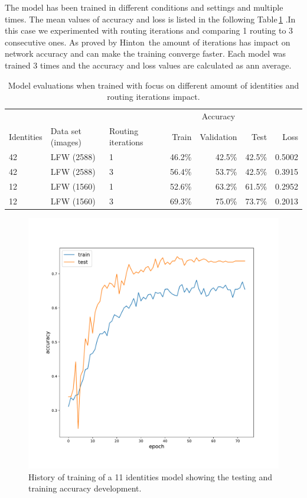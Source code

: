 The model has been trained in different conditions and settings and multiple times. The mean values of accuracy and loss is listed in the following Table\,\ref{tab:eval} .In this case we experimented with routing iterations and comparing 1 routing to 3 consecutive ones. As proved by Hinton\,\cite{capsule} the amount of iterations has impact on network accuracy and can make the training converge faster. Each model was trained 3 times and the accuracy and loss values are calculated as ann average.

\begin{table}[ht]
    \centering
    \begin{tabular}{l|l|l|rrr|r}
        \toprule
                   &                   &                    & \multicolumn{3}{c|}{Accuracy}             & \\
        Identities & Data set (images) & Routing iterations & Train        & Validation   & Test        & Loss \\
        \midrule
        \num{42}   & LFW (\num{2588})  & 1                  & \num{46.2}\% & \num{42.5}\% & \num{42.5}\% & \num{0.5002} \\
        \num{42}   & LFW (\num{2588})  & 3                  & \num{56.4}\% & \num{53.7}\% & \num{42.5}\% & \num{0.3915} \\
        \num{12}   & LFW (\num{1560})  & 1                  & \num{52.6}\% & \num{63.2}\% & \num{61.5}\% & \num{0.2952} \\
        \num{12}   & LFW (\num{1560})  & 3                  & \num{69.3}\% & \num{75.0}\% & \num{73.7}\% & \num{0.2013} \\
        \bottomrule
    \end{tabular}
    \caption{Model evaluations when trained with focus on different amount of identities and routing iterations impact.}
    \label{tab:eval}
\end{table}

\begin{figure}[ht]
    \centering
    \includegraphics[width=.5\textwidth]{obrazky-figures/training.pdf}
    \caption{History of training of a 11 identities model showing the testing and training accuracy development.}
    \label{fig:accuracy}
\end{figure}

